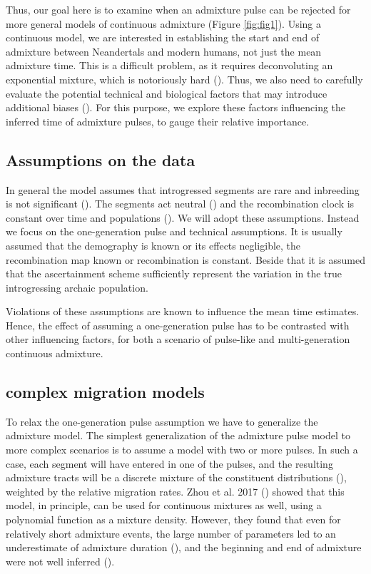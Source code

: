 \documentclass[]{article}
\begin{document}
Thus, our goal here is to examine when an admixture pulse can be rejected for more general models of continuous admixture (Figure \ref{fig:fig1}).  Using a continuous model, we are interested in establishing the start and end of admixture between Neandertals and modern humans, not just the mean admixture time. This is a difficult problem, as it requires deconvoluting an exponential mixture, which is notoriously hard (\cite{dasgupta_mixture_2008}). Thus, we also need to carefully evaluate the potential technical and biological factors that may introduce additional biases (\cite{pool_inference_2009,gravel_population_2012,liang_lengths_2014}).
For this purpose, we explore these factors influencing the inferred time of admixture pulses, to gauge their relative importance.



\subsection{Assumptions on the data}\label{assumptions-on-the-data}

In general the model assumes that introgressed segments are rare and inbreeding is not significant (\cite{pool_inference_2009}). The segments act neutral (\cite{shchur_distribution_2019}) and the recombination clock is constant over time and populations (\cite{gravel_population_2012}). We will adopt these assumptions. Instead we focus on the one-generation pulse and technical assumptions. It is usually assumed that the demography is known or its effects negligible, the recombination map known or recombination is constant. Beside that it is assumed that the ascertainment scheme sufficiently represent the variation in the true introgressing archaic population.

Violations of these assumptions are known to influence the mean time
estimates. Hence, the effect of assuming a one-generation pulse has to
be contrasted with other influencing factors, for both a scenario of
pulse-like and multi-generation continuous admixture. 


\subsection{complex migration models}

To relax the one-generation pulse assumption we have to generalize the admixture model.
The simplest generalization of the admixture pulse model to more complex scenarios is to assume a model with two or more pulses. In such a case,  each segment will have entered in one of the pulses, and the resulting admixture tracts will be a discrete mixture of the constituent distributions (\cite{pickrell_ancient_2014}), weighted by the relative migration rates. Zhou et al. 2017 (\cite{zhou_modeling_2017}) showed that this model, in principle, can be used for continuous mixtures as well, using a polynomial function as a mixture density. However, they found that even for relatively short admixture events, the large number of parameters led to an underestimate of admixture duration (\cite{zhou_inference_2017}), and the beginning and end of admixture were not well inferred
(\cite{zhou_modeling_2017,zhou_inference_2017}). 
\end{document}
